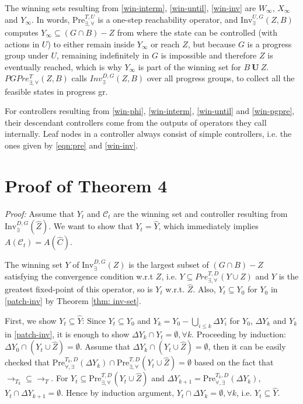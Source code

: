 The winning sets {\color{black} resulting from} \eqref{win-interm}, \eqref{win-until}, \eqref{win-inv} are $ W_{\infty} $, $ X_{\infty} $ and $ Y_{\infty} $. In words, {\color{black} $\text{Pre}_{\exists,\forall}^{T,U}$ is a one-step reachability operator, and $\text{Inv}_{\exists}^{U,G}(Z,B)$ computes $Y_\infty \subseteq (G\cap B) - Z$ from where the state can be controlled (with actions in $U$) to either remain inside $Y_\infty$ or reach $Z$, but because $G$ is a progress group under $U$, remaining indefinitely in $G$ is impossible and therefore $Z$ is eventually reached, which is why $Y_\infty$ is {\color{teal}part of the} winning set for $B\mathbf{\ U\ }Z$.} {\color{teal} $ PGPre_{\exists,\forall}^T(Z,B) $ calls $ Inv_{\exists}^{D,G}(Z,B) $  over all progress groups, to collect all the feasible states in progress gr.}
    
For controllers resulting from \eqref{win-phi}, \eqref{win-interm}, \eqref{win-until} and \eqref{win-pgpre}, their descendant controllers come from the outputs of operators they call internally. Leaf nodes in a controller always consist of simple controllers, i.e. the ones given by \eqref{eqn:pre} and \eqref{win-inv}. 

\section{Proof of Theorem 4}\label{app:pr-31}


\emph{Proof:} Assume that $ Y_t $ and $ \mathcal{C}_t $ are the winning set and controller resulting from $ \text{Inv}_{\exists}^{D,G} (\widehat{Z}) $. We want to show that $ Y_t=\widehat{Y}$, which immediately implies $ A(\mathcal{C}_t) = A(\widehat{C}) $.
	
The winning set $ Y $ of $ \text{Inv}_{\exists}^{D,G} (Z) $ is the largest subset of $ (G\cap B) - Z  $ satisfying the convergence condition w.r.t $ Z $, i.e. $ Y \subseteq Pre^{T,D}_{\exists, \forall}(Y\cup Z) $ and $Y$ is the greatest fixed-point of this operator, so is $ Y_t $ w.r.t. $ \widehat{Z} $. Also, $ Y_t \subseteq Y_0 $ for $ Y_0 $ in \eqref{patch-inv} by Theorem \ref{thm: inv-set}. 
	
	First, we show $ Y_t \subseteq \widehat{Y} $: Since $ Y_t\subseteq Y_0 $ and $ Y_k = Y_0 - \bigcup_{i\leq k} \Delta Y_i$ for $ Y_0 $, $ \Delta Y_k $ and $ Y_k $ in \eqref{patch-inv}, it is enough to show $ \Delta Y_k\cap Y_t = \emptyset,\forall k $. Proceeding by induction: $ \Delta Y_0\cap (Y_t\cup \widehat{Z}) = \emptyset $. Assume that $ \Delta Y_k \cap (Y_t\cup \widehat{Z}) = \emptyset $, then it can be easily checked that $\text{Pre}_{\forall, \exists}^{T_k,D}(\Delta Y_k) \cap  \text{Pre}_{\exists,\forall}^{T,D} (Y_t\cup \widehat{Z}) = \emptyset$ based on the fact that	 $ \rightarrow_{T_k}\subseteq \rightarrow_{T} $. For $ Y_t \subseteq \text{Pre}_{\exists,\forall}^{T,D} (Y_t\cup \widehat{Z}) $ and $ \Delta Y_{k+1} = \text{Pre}_{\forall, \exists}^{T_k,D}(\Delta Y_k) $, $ Y_t\cap \Delta Y_{k+1} = \emptyset $. Hence by induction argument, $ Y_t \cap \Delta Y_k = \emptyset, \forall k $, i.e. $ Y_t\subseteq \widehat{Y} $. 
	
